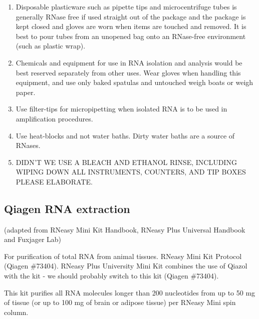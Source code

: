 \documentclass[11pt, oneside]{article}
\begin{document}
\begin{enumerate}
			\item Disposable plasticware such as pipette tips and microcentrifuge tubes is generally RNase free if used straight out of the package and 			the package is kept closed and gloves are worn when items are touched and removed. It is best to pour tubes from an unopened bag onto an 			RNase-free environment (such as plastic wrap). 

			\item Chemicals and equipment for use in RNA isolation and analysis would be best reserved separately from other uses. Wear gloves when 			handling this equipment, and use only baked spatulas and untouched weigh boats or weigh paper. 

			\item Use filter-tips for micropipetting when isolated RNA is to be used in amplification procedures. 

			\item Use heat-blocks and not water baths. Dirty water baths are a source of RNases. 

			\item DIDN'T WE USE A BLEACH AND ETHANOL RINSE, INCLUDING WIPING DOWN ALL INSTRUMENTS, COUNTERS, AND TIP 				BOXES  PLEASE ELABORATE.

 		\end{enumerate}
			
		\newpage

	\subsection{Qiagen RNA extraction} 
	
		\noindent (adapted from RNeasy Mini Kit Handbook, RNeasy Plus Universal Handbook and Fuxjager Lab)
	
		\vspace{5mm}

		\noindent For purification of total RNA from animal tissues. RNeasy Mini Kit Protocol (Qiagen \#73404). RNeasy Plus University Mini Kit combines 		the use of Qiazol with the kit - we should probably switch to this kit (Qiagen \#73404). 
	
		\vspace{5mm}
		

		\noindent This kit purifies all RNA molecules longer than 200 nucleotides from up to 50 mg of tissue (or up to 100 mg of brain or adipose tissue) per 		RNeasy Mini spin column. 
		
\end{document}
